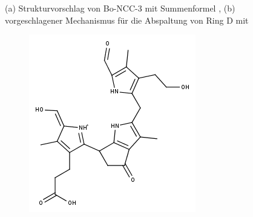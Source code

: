 \begin{figure}[!htbp]
\begin{subfigure}[b]{0.5\textwidth}
    \caption{}
    \label{fig:480Mechanismus}
  \end{subfigure}
  \caption[Strukturvorschlag von Bo-NCC-3 und Vorschlag für Mechanismus der Abspaltung von Ring D, Quelle: Autor]{(a) Strukturvorschlag von Bo-NCC-3 mit Summenformel , (b) vorgeschlagener Mechanismus für die Abspaltung von Ring D mit }
\end{figure}

\begin{figure}[!htbp]
  \begin{subfigure}[b]{0.5\textwidth}
    \includegraphics[width=\textwidth]{figures/Kapitel7/Kataboliten/fragmentation_structures/VWA_Katabolit_647-CO2-RingD_480_MH_Enolform.png}
    \caption{}
    \label{fig:NCC2725}
  \end{subfigure}
  \hfill
  \begin{subfigure}[b]{0.5\textwidth}

\end{subfigure}
\end{figure}

